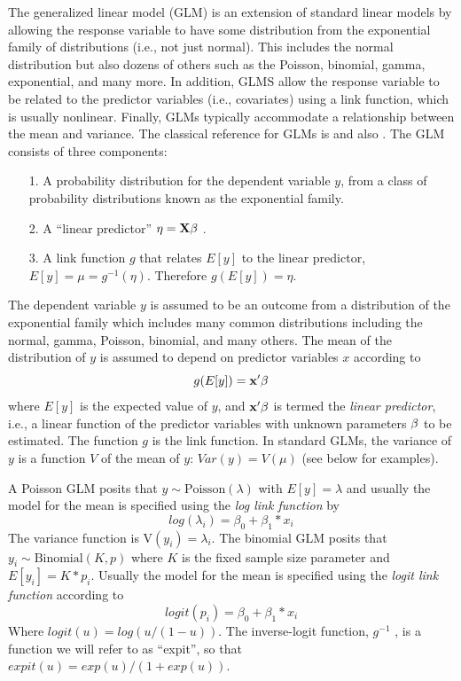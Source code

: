 The generalized linear model (GLM) is an extension of standard linear
models by allowing the response
variable to have some distribution from the exponential family of
distributions (i.e., not just normal). This includes the normal
distribution but also dozens of others such as the Poisson, binomial,
gamma, exponential, and many more. In addition, GLMS allow the
response variable to be related to the predictor variables (i.e.,
covariates) using a
link function, which is usually nonlinear.  Finally, GLMs typically
accommodate a relationship between the mean and variance. The
classical reference for GLMs is \citet{nelder_wedderburn:1972} and
also \citet{mccullagh_nelder:1989}.
The GLM consists of three components:
\begin{itemize}
\item[1.] A probability distribution for the dependent variable $y$, 
from a class of probability distributions known as the exponential family.
\item[2.] A ``linear predictor'' $\eta = {\bf X}{\bold \beta}$  . 
\item[3.] A link function $g$ that relates $E[y]$ to the linear predictor, $E[y] = \mu = g^{-1}(\eta)$. Therefore $g(E[y]) = \eta$.
\end{itemize}

The dependent variable $y$ is assumed to be an outcome from a
distribution of the exponential family which includes many common
distributions including the normal, gamma, Poisson, binomial, and many
others. The mean of the distribution of $y$ is assumed to depend on predictor variables $x$ according to 
\[
 g(E[y]) = {\bf x}'{\bold \beta}
\]
where $E[y]$ is the expected value of $y$, and ${\bf x}'{\bold \beta}$
is termed the {\it linear predictor}, i.e., a linear function of the
predictor variables with unknown parameters ${\bold \beta}$ to be
estimated.  The function $g$ is the link function. In standard GLMs,
the variance of $y$ is a function $V$ of the mean of $y$: $Var(y) =
V(\mu)$ (see below for examples).

A Poisson GLM posits that $y \sim \mbox{Poisson}(\lambda)$ with $E[y]
=\lambda$ and usually the model for the mean is specified using the
{\it log link function} by
\[
log(\lambda_{i}) = \beta_0 + \beta_{1}*x_{i}
\]
The variance function is $\mbox{V}(y_{i}) = \lambda_{i}$.  The
binomial GLM posits that $y_{i} \sim \mbox{Binomial}(K,p)$ where $K$
is the fixed sample size parameter and $E[y_{i}] = K*p_{i}$. Usually
the model for the mean is specified using the {\it logit link
  function} according to
\[
 logit(p_{i}) = \beta_{0} + \beta_{1}*x_{i}
\]
Where $logit(u) = log(u/(1-u))$.  The inverse-logit function, $g^{-1}$ ,
is a function we will refer to as ``expit'', so that $expit(u) =
exp(u)/(1+exp(u))$.

